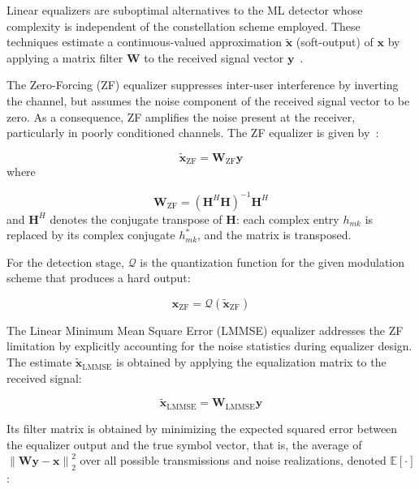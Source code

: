 \documentclass[12pt]{article}
\begin{document}
Linear equalizers are suboptimal alternatives to the ML detector whose
complexity is independent of the constellation scheme employed. These
techniques estimate a continuous-valued approximation $\tilde{\mathbf{x}}$
(soft-output) of $\mathbf{x}$ by applying a matrix filter $\mathbf{W}$ to
the received signal vector $\mathbf{y}$~\cite{rodriguezsanchez2020}.

The Zero-Forcing (ZF) equalizer suppresses inter-user interference by
inverting the channel, but assumes the noise component of the received signal
vector to be zero. As a consequence, ZF amplifies the noise present at the
receiver, particularly in poorly conditioned channels. The ZF equalizer is
given by~\cite{zero-forcing}:

\begin{equation}
\tilde{\mathbf{x}}_\text{ZF} =
\mathbf{W}_\text{ZF}\mathbf{y}
\label{eq:zf_estimate}
\end{equation}
where

\begin{equation}
\mathbf{W}_\text{ZF}=
\left(\mathbf{H}^H\mathbf{H}\right)^{-1}\mathbf{H}^H
\label{eq:zf_filter}
\end{equation}
and $\mathbf{H}^H$ denotes the conjugate transpose of $\mathbf{H}$:
each complex entry $h_{mk}$ is replaced by its complex conjugate
$h_{mk}^*$, and the matrix is transposed.


For the detection stage, $\mathcal{Q}$ is the quantization function for the
given modulation scheme that produces a hard output:

\begin{equation}
\hat{\mathbf{x}}_\text{ZF}=
\mathcal{Q}\left(\tilde{\mathbf{x}}_\text{ZF}\right)
\label{eq:zf_detection}
\end{equation}

The Linear Minimum Mean Square Error (LMMSE) equalizer addresses the ZF
limitation by explicitly accounting for the noise statistics during equalizer
design. The estimate $\tilde{\mathbf{x}}_\text{LMMSE}$ is obtained by applying the
equalization matrix to the received signal:

\begin{equation}
\tilde{\mathbf{x}}_\text{LMMSE}=
\mathbf{W}_\text{LMMSE}\mathbf{y}
\label{eq:lmmse_estimate}
\end{equation}


Its filter matrix is obtained by minimizing the expected squared error
between the equalizer output and the true symbol vector, that is, the
average of $\left\|\mathbf{W}\mathbf{y}-\mathbf{x}\right\|_2^2$ over
all possible transmissions and noise realizations, denoted
$\mathbb{E}\left[\cdot\right]$:
\end{document}
